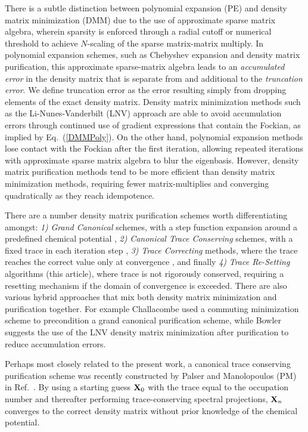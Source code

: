 \commentoutA{\documentclass[prb,aps,twocolumn,twocolumngrid,secnumarabic]{revtex4}}
\begin{document}
There is a subtle distinction between polynomial expansion (PE) and density 
matrix minimization (DMM) due to the use of approximate sparse matrix algebra, wherein
sparsity is enforced through a radial cutoff or numerical threshold  to 
achieve $N$-scaling of the sparse matrix-matrix multiply. In polynomial expansion schemes, 
such as Chebyshev expansion and density matrix purification, 
this approximate sparse-matrix algebra leads to an {\em accumulated error} in the density matrix 
that is separate from and additional to the {\em truncation error}.  We define truncation error as the 
error resulting simply from dropping elements of the exact density matrix.  Density matrix 
minimization methods such as the Li-Nunes-Vanderbilt\cite{XLi93,DBowler99} (LNV) approach are able to 
avoid accumulation errors through continued use of gradient expressions that contain the Fockian, 
as implied by Eq.~(\ref{DMMPoly}). On the other hand, polynomial expansion methods lose contact 
with the Fockian after the first iteration, allowing repeated iterations with 
approximate sparse matrix algebra to blur the eigenbasis.  However, density matrix purification 
methods tend to be more efficient than density matrix minimization methods, requiring fewer 
matrix-multiplies and converging quadratically as they reach idempotence.

There are a number density matrix purification schemes worth differentiating amongst: 
{\it 1)} {\it Grand Canonical} schemes, with a step function  expansion around a predefined 
         chemical potential \cite{RMcWeeny60,AHolas01},
{\it 2)} {\it Canonical Trace Conserving} schemes, with a fixed trace
         in each iteration step \cite{APalser99}, 
{\it 3)} {\it Trace Correcting} methods, where the trace reaches the correct value only at 
         convergence \cite{ANiklasson02B}, and finally 
{\it 4)} {\it Trace Re-Setting} algorithms (this article), where trace is not rigorously conserved,
          requiring a resetting  mechanism if the domain of convergence is exceeded.
There are also various hybrid approaches that mix both density matrix minimization and 
purification together.  For example Challacombe\cite{MChallacombe99} used a commuting 
 minimization scheme to precondition a grand canonical purification scheme,
while Bowler \cite{DBowler99} suggests the use of the LNV density matrix minimization 
after purification to reduce accumulation errors.

Perhaps most closely related to the present work, a canonical trace 
conserving purification scheme was recently constructed by Palser and Manolopoulos 
(PM) in Ref.~. 
By using a starting guess ${\bf X}_0$ with the trace equal to 
the occupation number and thereafter performing trace-conserving
spectral projections, ${\bf X}_n$ converges to the correct density matrix without
prior knowledge of the chemical potential. 
\end{document}

